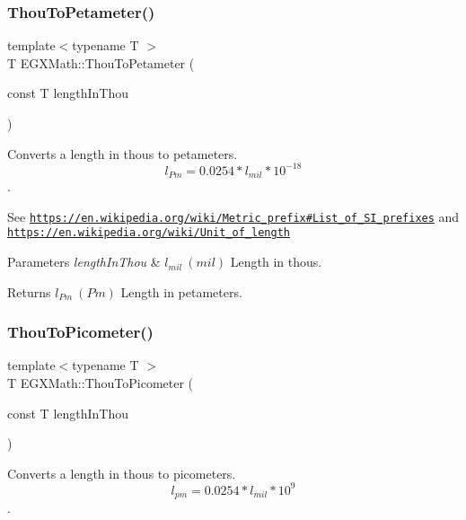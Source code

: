 \subsubsection{\texorpdfstring{Thou\+To\+Petameter()}{ThouToPetameter()}}
{\footnotesize\ttfamily template$<$typename T $>$ \\
T E\+G\+X\+Math\+::\+Thou\+To\+Petameter (\begin{DoxyParamCaption}\item[{const T}]{length\+In\+Thou }\end{DoxyParamCaption})}



Converts a length in thous to petameters. \[ l_{Pm}=0.0254 * l_{mil} * 10^{-18} \]. 

See \href{https://en.wikipedia.org/wiki/Metric_prefix#List_of_SI_prefixes}{\tt https\+://en.\+wikipedia.\+org/wiki/\+Metric\+\_\+prefix\#\+List\+\_\+of\+\_\+\+S\+I\+\_\+prefixes} and \href{https://en.wikipedia.org/wiki/Unit_of_length}{\tt https\+://en.\+wikipedia.\+org/wiki/\+Unit\+\_\+of\+\_\+length} 
\begin{DoxyParams}{Parameters}
{\em length\+In\+Thou} & $ l_{mil}\ (mil)$ Length in thous. \\
\hline
\end{DoxyParams}
\begin{DoxyReturn}{Returns}
$ l_{Pm}\ (Pm)$ Length in petameters. 
\end{DoxyReturn}
\mbox{\label{group___e_g_x_math-_conversions-_length_conversions-_imperial-_thou-_s_i_gabc7a92b07f617bdf0ac0249d34c4aa4c}} 
\subsubsection{\texorpdfstring{Thou\+To\+Picometer()}{ThouToPicometer()}}
{\footnotesize\ttfamily template$<$typename T $>$ \\
T E\+G\+X\+Math\+::\+Thou\+To\+Picometer (\begin{DoxyParamCaption}\item[{const T}]{length\+In\+Thou }\end{DoxyParamCaption})}



Converts a length in thous to picometers. \[ l_{pm}=0.0254 * l_{mil} * 10^{9} \]. 


